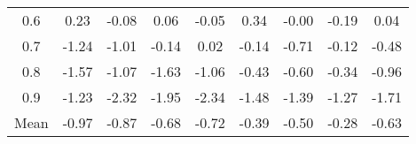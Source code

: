 \documentclass[11pt,a4paper]{report}
\begin{document}
\begin{longtable}{ | c || c | c | c | c | c | c | c || c |}
0.6 &  \cellcolor[HTML]{F7F7FF} 0.23 &  \cellcolor[HTML]{FFFFFF} -0.08 &  \cellcolor[HTML]{FFFFFF} 0.06 &  \cellcolor[HTML]{FFFFFF} -0.05 &  \cellcolor[HTML]{F7F7FF} 0.34 &  \cellcolor[HTML]{FFFFFF} -0.00 &  \cellcolor[HTML]{FFF7F7} -0.19 &  \cellcolor[HTML]{FFFFFF} 0.04 \\
0.7 &  \cellcolor[HTML]{FFDFDF} -1.24 &  \cellcolor[HTML]{FFE7E7} -1.01 &  \cellcolor[HTML]{FFFFFF} -0.14 &  \cellcolor[HTML]{FFFFFF} 0.02 &  \cellcolor[HTML]{FFFFFF} -0.14 &  \cellcolor[HTML]{FFEFEF} -0.71 &  \cellcolor[HTML]{FFFFFF} -0.12 &  \cellcolor[HTML]{FFEFEF} -0.48 \\
0.8 &  \cellcolor[HTML]{FFD7D7} -1.57 &  \cellcolor[HTML]{FFE7E7} -1.07 &  \cellcolor[HTML]{FFD7D7} -1.63 &  \cellcolor[HTML]{FFE7E7} -1.06 &  \cellcolor[HTML]{FFF7F7} -0.43 &  \cellcolor[HTML]{FFEFEF} -0.60 &  \cellcolor[HTML]{FFF7F7} -0.34 &  \cellcolor[HTML]{FFE7E7} -0.96 \\
0.9 &  \cellcolor[HTML]{FFDFDF} -1.23 &  \cellcolor[HTML]{FFC7C7} -2.32 &  \cellcolor[HTML]{FFCFCF} -1.95 &  \cellcolor[HTML]{FFC7C7} -2.34 &  \cellcolor[HTML]{FFD7D7} -1.48 &  \cellcolor[HTML]{FFDFDF} -1.39 &  \cellcolor[HTML]{FFDFDF} -1.27 &  \cellcolor[HTML]{FFD7D7} -1.71 \\
\hline
\hline
Mean  &  \cellcolor[HTML]{FFE7E7} -0.97 &  \cellcolor[HTML]{FFE7E7} -0.87 &  \cellcolor[HTML]{FFEFEF} -0.68 &  \cellcolor[HTML]{FFEFEF} -0.72 &  \cellcolor[HTML]{FFF7F7} -0.39 &  \cellcolor[HTML]{FFEFEF} -0.50 &  \cellcolor[HTML]{FFF7F7} -0.28 &  \cellcolor[HTML]{FFEFEF} -0.63 \\
\hline
\end{longtable}
\end{document}
